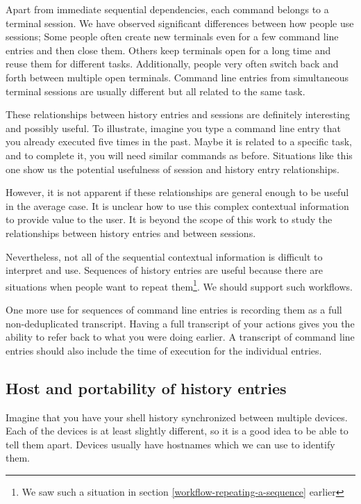 Apart from immediate sequential dependencies, each command belongs to a terminal session. We have observed significant differences between how people use sessions; Some people often create new terminals even for a few command line entries and then close them. Others keep terminals open for a long time and reuse them for different tasks.
Additionally, people very often switch back and forth between multiple open terminals. Command line entries from simultaneous terminal sessions are usually different but all related to the same task.

These relationships between history entries and sessions are definitely interesting and possibly useful. To illustrate, imagine you type a command line entry that you already executed five times in the past. Maybe it is related to a specific task, and to complete it, you will need similar commands as before. Situations like this one show us the potential usefulness of session and history entry relationships.

However, it is not apparent if these relationships are general enough to be useful in the average case. It is unclear how to use this complex contextual information to provide value to the user. It is beyond the scope of this work to study the relationships between history entries and between sessions.

Nevertheless, not all of the sequential contextual information is difficult to interpret and use. Sequences of history entries are useful because there are situations when people want to repeat them\footnote{We saw such a situation in section \ref{workflow-repeating-a-sequence} earlier}. We should support such workflows.

One more use for sequences of command line entries is recording them as a full non-deduplicated transcript. Having a full transcript of your actions gives you the ability to refer back to what you were doing earlier. A transcript of command line entries should also include the time of execution for the individual entries.

\subsection{Host and portability of history entries}

Imagine that you have your shell history synchronized between multiple devices.
Each of the devices is at least slightly different, so it is a good idea to be able to tell them apart. Devices usually have hostnames which we can use to identify them. 

